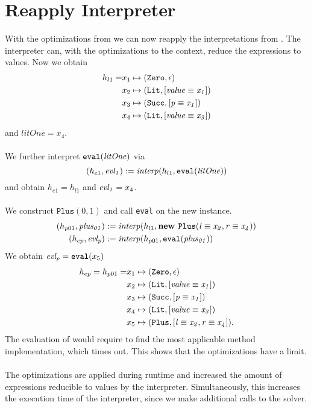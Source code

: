 \section{Reapply Interpreter} %
With the optimizations from 
we can now reapply the interpretations from .
The interpreter can, with the optimizations to the context,
reduce the expressions to values.
Now we obtain
\begin{align*}
h_{l1} = &x_1 \mapsto (\texttt{Zero}, \epsilon)\\
         &x_2 \mapsto (\texttt{Lit}, [\mathit{\mathit{value}} \equiv \mathit{x_1}])\\
         &x_3 \mapsto (\texttt{Succ}, [\mathit{\mathit{p}} \equiv \mathit{x_1}])\\
         &x_4 \mapsto (\texttt{Lit}, [\mathit{\mathit{value}} \equiv \mathit{x_3}])
\end{align*}
and $litOne = x_4$.\\
\\
We further interpret $\texttt{eval}(\mathit{litOne})$ via
\[
(h_{e1}, \mathit{evl_1}) := \mathit{interp}(h_{l1}, \texttt{eval}(\mathit{litOne}))
\]
and obtain $h_{e1} = h_{l1}$ and $\mathit{evl_1} = x_4$.\\
\\
We construct $\texttt{Plus}(0, 1)$ and call \texttt{eval}
on the new instance.
\begin{align*}
(h_{p01}, \mathit{plus_{01}}) &:= \mathit{interp}(h_{l1}, \textbf{new } \mathit{\texttt{Plus}}(\mathit{\mathit{l} \equiv \mathit{x_2}, \mathit{r} \equiv \mathit{x_4}}))\\
(h_{ep}, \mathit{evl_p}) & := \mathit{interp}(h_{p01}, \texttt{eval}(\mathit{plus_{01}}))
\end{align*}
We obtain $\mathit{evl_p} = \texttt{eval}(x_5)$
\begin{align*}
h_{ep} = h_{p01} = &x_1 \mapsto (\texttt{Zero}, \epsilon)\\
                   &x_2 \mapsto (\texttt{Lit}, [\mathit{\mathit{value}} \equiv \mathit{x_1}])\\
                   &x_3 \mapsto (\texttt{Succ}, [\mathit{\mathit{p}} \equiv \mathit{x_1}])\\
                   &x_4 \mapsto (\texttt{Lit}, [\mathit{\mathit{value}} \equiv \mathit{x_3}])\\
                   &x_5 \mapsto (\texttt{Plus}, [\mathit{l} \equiv \mathit{x_2}, \mathit{r} \equiv \mathit{x_4}]).
\end{align*}
%
The evaluation of  would require
to find the most applicable method implementation,
which times out.
This shows that the optimizations have a limit.\\
\\
The optimizations are applied during runtime and
increased the amount of expressions
reducible to values by the interpreter.
Simultaneously, this increases the
execution time of the interpreter,
since we make additional calls to the solver.

